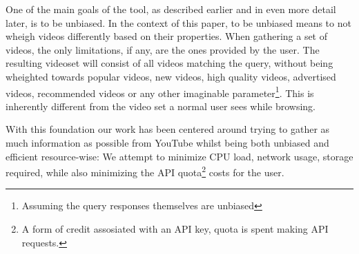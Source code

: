 One of the main goals of the tool, as described earlier and in even more detail
later, is to be unbiased. In the context of this paper, to be unbiased means
to not wheigh videos differently based on their properties. When gathering a
set of videos, the only limitations, if any, are the ones provided by the user.
The resulting videoset will consist of all videos matching the query, without
being wheighted towards popular videos, new videos, high quality videos, 
advertised videos, recommended videos or any other imaginable
parameter\footnote{Assuming the query responses themselves are unbiased}. This
is inherently different from the video set a normal user sees while browsing.

With this foundation our work has been centered around trying to gather as much
information as possible from YouTube whilst being both unbiased and efficient
resource-wise: We attempt to minimize CPU load, network usage, storage required,
while also minimizing the API quota\footnote{A form of credit assosiated with an API key, quota is spent making API requests.} costs for the user.

